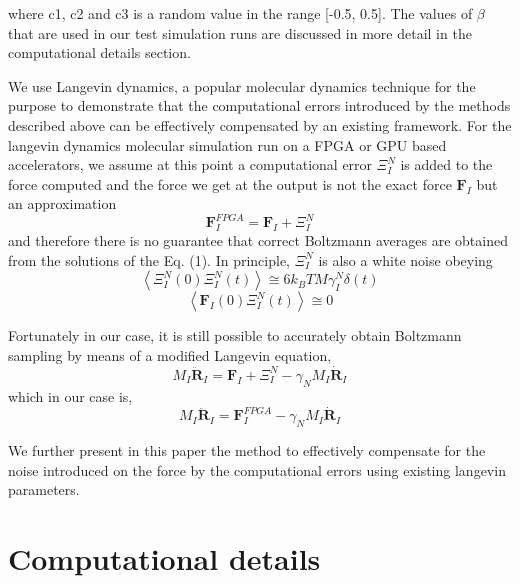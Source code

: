 \documentclass[aps,pre,twocolumn,showpacs,preprintnumbers,amsmath,amssymb]{revtex4-1}
\begin{document}
where c1, c2 and c3 is a random value in the range [-0.5, 0.5]. The values of \(\beta\) that are used in our test simulation runs are discussed in more detail in the computational details section.

We use Langevin dynamics, a popular molecular dynamics technique for the purpose to demonstrate that the computational errors introduced by the methods described above can be effectively compensated by an existing framework. 
For the langevin dynamics molecular simulation run on a FPGA or GPU based accelerators, we assume at this point a computational error \(\Xi _{I}^{N}\) is added to the force computed and the force we get at the output is not the exact force \(\textbf{F}_{I}\) but an approximation
\begin{equation}
\textbf{F}_{I}^{FPGA} = \textbf{F}_{I}+\Xi _{I}^{N}
\end{equation} 
and therefore there is no guarantee that correct Boltzmann averages are obtained from the solutions of the Eq. (1). In principle, \(\Xi _{I}^{N}\) is also a white noise obeying 
\begin{equation}
\left \langle \Xi _{I}^{N}\left ( 0 \right ) \Xi _{I}^{N}\left ( t \right ) \right \rangle \cong  6k_{B}TM\gamma _{I}^{N}\delta \left ( t \right )
\end{equation}  
\begin{equation}
 \left \langle \textbf{F}_{I}\left ( 0 \right ) \Xi _{I}^{N}\left ( t \right )\right \rangle \cong  0
\end{equation} 

Fortunately in our case, it is still possible to accurately obtain Boltzmann sampling by means of a modified Langevin equation, 
\begin{equation}
M_{I}\ddot{\textbf{R}}_{I}=\textbf{F}_{I}+\Xi _{I}^{N}-\gamma _{N}M_{I}\dot{\textbf{R}}_{I} 
\end{equation}
which in our case is,
\begin{equation}
M_{I}\ddot{\textbf{R}}_{I} = \textbf{F}_{I}^{FPGA}-\gamma _{N}M_{I}\dot{\textbf{R}}_{I}
\end{equation}

We further present in this paper the method to effectively compensate for the noise introduced on the force by the computational errors using existing langevin parameters. 

 
\section{Computational details}
\end{document}
